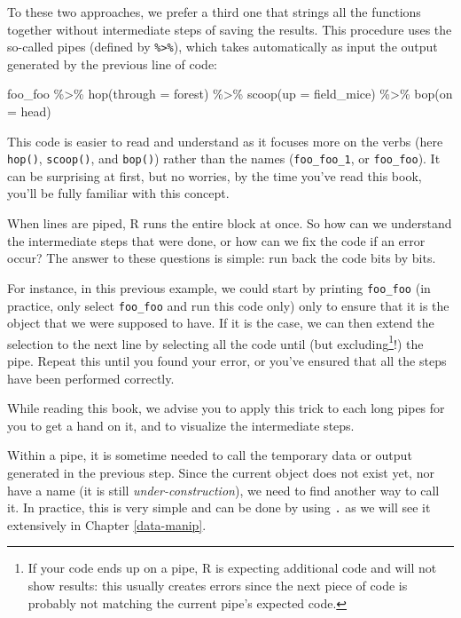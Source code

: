 \documentclass[
]{krantz}
\makeatletter
\newenvironment{Shaded}{\begin{snugshade}}{\end{snugshade}}
\newcommand{\AttributeTok}[1]{\textcolor[rgb]{0.61,0.61,0.61}{#1}}
\newcommand{\FunctionTok}[1]{\textcolor[rgb]{0,0,0}{#1}}
\newcommand{\NormalTok}[1]{#1}
\newcommand{\SpecialCharTok}[1]{\textcolor[rgb]{0,0,0}{#1}}
\renewenvironment{quote}{\begin{VF}}{\end{VF}}
\newenvironment{kframe}{%
\medskip{}
\setlength{\fboxsep}{.8em}
 \def\at@end@of@kframe{}%
 \ifinner\ifhmode%
  \def\at@end@of@kframe{\end{minipage}}%
  \begin{minipage}{\columnwidth}%
 \fi\fi%
 \def\FrameCommand##1{\hskip\@totalleftmargin \hskip-\fboxsep
 \colorbox{shadecolor}{##1}\hskip-\fboxsep
     \hskip-\linewidth \hskip-\@totalleftmargin \hskip\columnwidth}%
 \MakeFramed {\advance\hsize-\width
   \@totalleftmargin\z@ \linewidth\hsize
   \@setminipage}}%
 {\par\unskip\endMakeFramed%
 \at@end@of@kframe}
\renewenvironment{Shaded}{\begin{kframe}}{\end{kframe}}
\makeatother
\begin{document}
To these two approaches, we prefer a third one that strings all the functions together without intermediate steps of saving the results. This procedure uses the so-called pipes (defined by \texttt{\%\textgreater{}\%}), which takes automatically as input the output generated by the previous line of code:

\begin{Shaded}
\begin{Highlighting}[]
\NormalTok{foo\_foo }\SpecialCharTok{\%\textgreater{}\%} 
  \FunctionTok{hop}\NormalTok{(}\AttributeTok{through =}\NormalTok{ forest) }\SpecialCharTok{\%\textgreater{}\%} 
  \FunctionTok{scoop}\NormalTok{(}\AttributeTok{up =}\NormalTok{ field\_mice) }\SpecialCharTok{\%\textgreater{}\%} 
  \FunctionTok{bop}\NormalTok{(}\AttributeTok{on =}\NormalTok{ head)}
\end{Highlighting}
\end{Shaded}

This code is easier to read and understand as it focuses more on the verbs (here \texttt{hop()}, \texttt{scoop()}, and \texttt{bop()}) rather than the names (\texttt{foo\_foo\_1}, or \texttt{foo\_foo}). It can be surprising at first, but no worries, by the time you've read this book, you'll be fully familiar with this concept.

When lines are piped, R runs the entire block at once. So how can we understand the intermediate steps that were done, or how can we fix the code if an error occur? The answer to these questions is simple: run back the code bits by bits.

For instance, in this previous example, we could start by printing \texttt{foo\_foo} (in practice, only select \texttt{foo\_foo} and run this code only) only to ensure that it is the object that we were supposed to have. If it is the case, we can then extend the selection to the next line by selecting all the code until (but excluding\footnote{If your code ends up on a pipe, R is expecting additional code and will not show results: this usually creates errors since the next piece of code is probably not matching the current pipe's expected code.}!) the pipe. Repeat this until you found your error, or you've ensured that all the steps have been performed correctly.

While reading this book, we advise you to apply this trick to each long pipes for you to get a hand on it, and to visualize the intermediate steps.

\begin{quote}
Within a pipe, it is sometime needed to call the temporary data or output generated in the previous step. Since the current object does not exist yet, nor have a name (it is still \emph{under-construction}), we need to find another way to call it. In practice, this is very simple and can be done by using \texttt{.} as we will see it extensively in Chapter \ref{data-manip}.
\end{quote}
\end{document}
